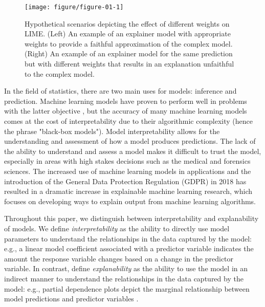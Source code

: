 \documentclass[AMS,STIX2COL]{WileyNJD-v2}\usepackage[]{graphicx}\usepackage[]{color}
\newenvironment{knitrout}{}{} %
\begin{document}
\begin{figure}[!thp]
\begin{knitrout}
\color{fgcolor}

{\centering \texttt{[image: figure/figure-01-1]} 

}



\end{knitrout}
\caption{Hypothetical scenarios depicting the effect of different weights on LIME. (Left) An example of an explainer model with appropriate weights to provide a faithful approximation of the complex model. (Right) An example of an explainer model for the same prediction but with different weights that results in an explanation unfaithful to the complex model.  }
\label{fig:figure-01}
\end{figure}

In the field of statistics, there are two main uses for models: inference and prediction. Machine learning models  have proven to perform well in problems with the latter objective , but the accuracy of many machine learning models comes at the cost of interpretability due to their algorithmic complexity (hence the phrase "black-box models"). Model interpretability allows for the understanding and assessment of how a model produces predictions. The lack of the ability to understand and assess a model makes it difficult to trust the model, especially in areas with high stakes decisions such as the medical and forensics sciences. The increased use of machine learning models in applications and the introduction of the General Data Protection Regulation (GDPR) in 2018 \citep{goodman:2016} has resulted in a dramatic increase in explainable machine learning research, which focuses on developing ways to explain output from machine learning algorithms.

Throughout this paper, we distinguish between interpretability and explanability of models. We define {\it interpretability} as the ability to directly use model parameters to understand the relationships in the data captured by the model: e.g., a linear model coefficient associated with a predictor variable indicates the amount the response variable changes based on a change in the predictor variable. In contrast, define {\it explanability} as the ability to use the model in an indirect manner to understand the relationships in the data captured by the model: e.g., partial dependence plots depict the marginal relationship between model predictions and predictor variables \citep{friedman:2001}.
\end{document}
